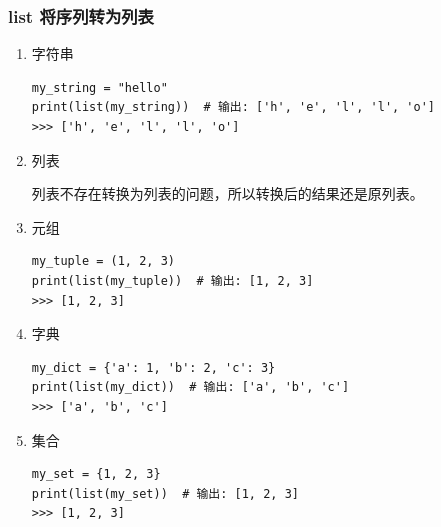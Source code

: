 \subsubsection{list 将序列转为列表}
\begin{enumerate}[label=\arabic*)]
    \item 字符串
\begin{lstlisting}[style=demostyle,numbers=none]
my_string = "hello"
print(list(my_string))  # 输出: ['h', 'e', 'l', 'l', 'o']
>>> ['h', 'e', 'l', 'l', 'o']
\end{lstlisting}

    \item 列表

    列表不存在转换为列表的问题，所以转换后的结果还是原列表。

    \item 元组
\begin{lstlisting}[style=demostyle,numbers=none]
my_tuple = (1, 2, 3)
print(list(my_tuple))  # 输出: [1, 2, 3]
>>> [1, 2, 3]
\end{lstlisting}

    \item 字典
\begin{lstlisting}[style=demostyle,numbers=none]
my_dict = {'a': 1, 'b': 2, 'c': 3}
print(list(my_dict))  # 输出: ['a', 'b', 'c']
>>> ['a', 'b', 'c']
\end{lstlisting}

    \item 集合
\begin{lstlisting}[style=demostyle,numbers=none]
my_set = {1, 2, 3}
print(list(my_set))  # 输出: [1, 2, 3]
>>> [1, 2, 3]
\end{lstlisting}
\end{enumerate}

